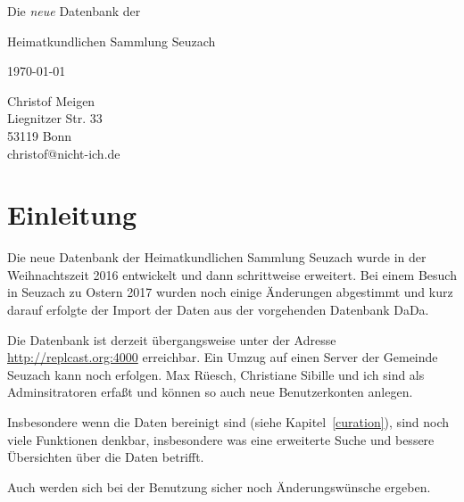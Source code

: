 \documentclass[12pt]{scrreprt}
\begin{document}
\def\DB{Datenbank der Heimatkundlichen Sammlung Seuzach}
\def\RB#1{{\color{red} \textsf{\textbf{#1}}}}
\strut
\thispagestyle{empty}
\vfill


\begin{center}
  
{\Huge Die \textit{neue} Datenbank der

  \medskip
  
Heimatkundlichen Sammlung Seuzach}

\bigskip


\bigskip

\today
\end{center}


\vfill

\hfill \begin{minipage}{5cm}
  Christof Meigen\\
  Liegnitzer Str. 33 \\
53119 Bonn \\
christof@nicht-ich.de
\end{minipage}

\clearpage

\tableofcontents

\clearpage

\chapter{Einleitung}

Die neue Datenbank der Heimatkundlichen Sammlung Seuzach wurde in der Weihnachtszeit 2016
entwickelt und dann schrittweise erweitert. Bei einem Besuch in Seuzach zu Ostern 2017
wurden noch einige Änderungen abgestimmt und kurz darauf erfolgte der Import der Daten aus
der vorgehenden Datenbank DaDa.

Die Datenbank ist derzeit übergangsweise unter der Adresse
\url{http://replcast.org:4000} erreichbar. Ein Umzug auf einen Server
der Gemeinde Seuzach kann noch erfolgen. Max Rüesch, Christiane
Sibille und ich sind als Adminsitratoren erfaßt und können so auch
neue Benutzerkonten anlegen.

Insbesondere wenn die Daten bereinigt sind (siehe
Kapitel~\ref{curation}), sind noch viele Funktionen denkbar,
insbesondere was eine erweiterte Suche und bessere Übersichten über
die Daten betrifft.

Auch werden sich bei der Benutzung sicher noch Änderungswünsche
ergeben.
\end{document}
